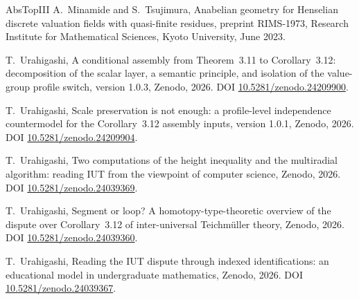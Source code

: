 \documentclass[11pt]{article}
\theoremstyle{plain}
\theoremstyle{definition}
\theoremstyle{remark}
\begin{document}
\begin{thebibliography}{AbsTopIII}
 A.~Minamide and S.~Tsujimura, Anabelian geometry
for Henselian discrete valuation fields with quasi-finite residues,
preprint RIMS-1973, Research Institute for Mathematical Sciences,
Kyoto University, June 2023.

 T.~Urahigashi, A conditional assembly from
Theorem~3.11 to Corollary~3.12: decomposition of the scalar layer, a
semantic principle, and isolation of the value-group profile switch,
version 1.0.3, Zenodo, 2026.
DOI \href{https://doi.org/10.5281/zenodo.24209900}{10.5281/zenodo.24209900}.

 T.~Urahigashi, Scale preservation is not enough:
a profile-level independence countermodel for the Corollary~3.12
assembly inputs, version 1.0.1, Zenodo, 2026.
DOI \href{https://doi.org/10.5281/zenodo.24209904}{10.5281/zenodo.24209904}.

 T.~Urahigashi, Two computations of the height
inequality and the multiradial algorithm: reading IUT from the
viewpoint of computer science, Zenodo, 2026.
DOI \href{https://doi.org/10.5281/zenodo.24039369}{10.5281/zenodo.24039369}.

 T.~Urahigashi, Segment or loop? A
homotopy-type-theoretic overview of the dispute over
Corollary~3.12 of inter-universal Teichm\"uller theory, Zenodo,
2026.
DOI \href{https://doi.org/10.5281/zenodo.24039360}{10.5281/zenodo.24039360}.

 T.~Urahigashi, Reading the IUT dispute
through indexed identifications: an educational model in
undergraduate mathematics, Zenodo, 2026.
DOI \href{https://doi.org/10.5281/zenodo.24039367}{10.5281/zenodo.24039367}.

\end{thebibliography}
\end{document}
